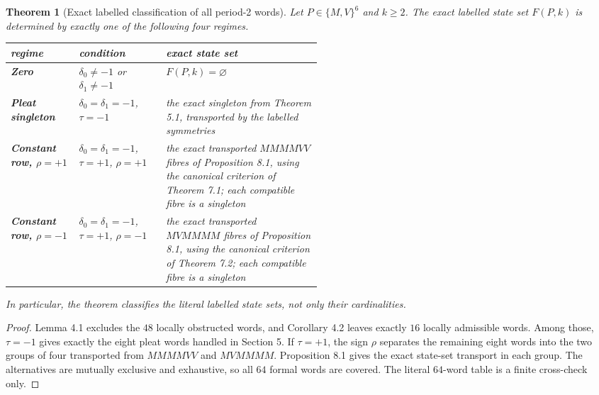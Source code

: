 \documentclass[11pt]{article}
\newtheorem{theorem}{Theorem}[section]
\theoremstyle{definition}
\theoremstyle{remark}
\begin{document}
\begin{theorem}[Exact labelled classification of all period-2 words]\label{obj:T4}
Let \(P\in\{M,V\}^6\) and \(k\ge2\). The exact labelled state set
\(F(P,k)\) is determined by exactly one of the following four regimes.

\begin{center}
\small
\begin{tabularx}{\linewidth}{@{}>{\raggedright\arraybackslash}p{0.22\linewidth}>{\raggedright\arraybackslash}p{0.29\linewidth}>{\raggedright\arraybackslash}X@{}}
\toprule
regime & condition & exact state set \\
\midrule
\textbf{Zero} & $\delta_0\ne-1$ or $\delta_1\ne-1$ & $F(P,k)=\varnothing$ \\
\textbf{Pleat singleton} & $\delta_0=\delta_1=-1$, $\tau=-1$ & the exact singleton from Theorem 5.1, transported by the labelled symmetries \\
\textbf{Constant row, $\rho=+1$} & $\delta_0=\delta_1=-1$, $\tau=+1$, $\rho=+1$ & the exact transported $MMMMVV$ fibres of Proposition 8.1, using the canonical criterion of Theorem 7.1; each compatible fibre is a singleton \\
\textbf{Constant row, $\rho=-1$} & $\delta_0=\delta_1=-1$, $\tau=+1$, $\rho=-1$ & the exact transported $MVMMMM$ fibres of Proposition 8.1, using the canonical criterion of Theorem 7.2; each compatible fibre is a singleton \\
\bottomrule
\end{tabularx}
\end{center}

In particular, the theorem classifies the literal labelled state sets,
not only their cardinalities.
\end{theorem}
\begin{proof}
 Lemma 4.1 excludes the \(48\) locally obstructed words,
and Corollary 4.2 leaves exactly \(16\) locally admissible words. Among
those, \(\tau=-1\) gives exactly the eight pleat words handled in
Section 5. If \(\tau=+1\), the sign \(\rho\) separates the remaining
eight words into the two groups of four transported from \(MMMMVV\) and
\(MVMMMM\). Proposition 8.1 gives the exact state-set transport in each
group. The alternatives are mutually exclusive and exhaustive, so all
\(64\) formal words are covered. The literal \(64\)-word table is a
finite cross-check only.
\end{proof}


\begin{table}[htbp]
\centering
\caption{Invariant/regime summary. The exact state-set description precedes the downstream count.}
\label{tab:m4-tbl1}
\resizebox{\linewidth}{!}{}
\end{table}
\end{document}

